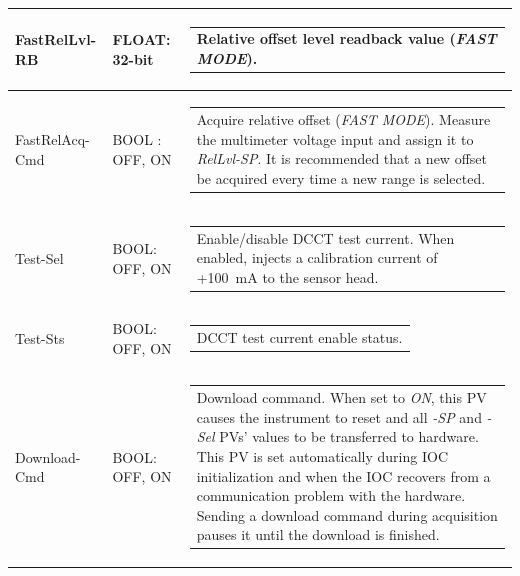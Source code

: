 \documentclass[openany]{article}
\begin{document}
\begin{longtable}{| m{3.0cm} m{4.5cm} m{7.0cm} |}
		FastRelLvl-RB & FLOAT: 32-bit & \begin{tabular}{@{}m{6cm}@{}}
	    					Relative offset level readback value (\emph{FAST MODE}).
						\end{tabular} \\ \hline
		FastRelAcq-Cmd & BOOL : OFF, ON & \begin{tabular}{@{}m{6cm}@{}}
						Acquire relative offset (\emph{FAST MODE}). Measure the multimeter voltage input and assign it to \emph{RelLvl-SP}. It is recommended that a new offset be acquired every time a new range is selected.
						\end{tabular} \\ \hline
		Test-Sel & BOOL: OFF, ON & \begin{tabular}{@{}m{6cm}@{}}
	    					Enable/disable DCCT test current. When enabled, injects a calibration current of +\SI{100}{\milli\ampere} to the sensor head.
						\end{tabular} \\ \hline
		Test-Sts & BOOL: OFF, ON & \begin{tabular}{@{}m{6cm}@{}}
 						DCCT test current enable status.
						\end{tabular} \\ \hline
		Download-Cmd & BOOL: OFF, ON & \begin{tabular}{@{}m{6cm}@{}}
 						Download command. When set to \emph{ON}, this PV causes the instrument to reset and all \emph{-SP} and \emph{-Sel} PVs' values to be transferred to hardware. This PV is set automatically during IOC initialization and when the IOC recovers from a communication problem with the hardware. Sending a download command during acquisition pauses it until the download is finished.
						\end{tabular} \\ \hline
	\end{longtable}
\end{document}
